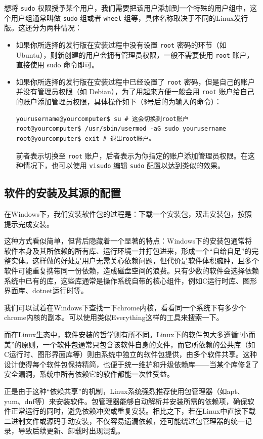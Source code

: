 想将 \verb|sudo| 权限授予某个用户，我们需要把该用户添加到一个特殊的用户组中，这个用户组通常叫做 \verb|sudo| 组或者 \verb|wheel| 组等，具体名称取决于不同的Linux发行版。这还分为两种情况：
\begin{itemize}
  \item 如果你所选择的发行版在安装过程中没有设置 \verb|root| 密码的环节（如 Ubuntu），则新创建的用户会拥有管理员权限，一般不需要使用 \verb|root| 账户，直接使用 sudo 命令即可。
  \item 如果你所选择的发行版在安装过程中已经设置了 \verb|root| 密码，但是自己的账户并没有管理员权限（如 Debian），为了用起来方便一般会用 \verb|root| 账户给自己的账户添加管理员权限，具体操作如下（\$号后的为输入的命令）：
\begin{verbatim}
yourusername@yourcomputer$ su # 这会切换到root账户
root@yourcomputer$ /usr/sbin/usermod -aG sudo yourusername
root@yourcomputer$ exit # 退出root账户。
\end{verbatim}
前者表示切换至 \verb|root| 账户，后者表示为你指定的账户添加管理员权限。在这种情况下，也可以使用 \verb|visudo| 编辑 \verb|sudo| 配置以达到类似的效果。
\end{itemize}

\subsection{软件的安装及其源的配置}\label{sec:apt-source}

在Windows下，我们安装软件包的过程是：下载一个安装包，双击安装包，按照提示完成安装。

这种方式看似简单，但背后隐藏着一个显著的特点：Windows下的安装包通常将软件本身及其所依赖的所有库、运行环境一并打包进来，形成一个“自给自足”的完整实体。这样做的好处是用户无需关心依赖问题，但代价是软件体积臃肿，且多个软件可能重复携带同一份依赖，造成磁盘空间的浪费。只有少数的软件会选择依赖系统中已有的库，这些库通常是操作系统自带的核心组件，例如C运行时库、图形界面库、dotnet运行时等。

我们可以试着在Windows下查找一下chrome内核，看看同一个系统下有多少个chrome内核的副本。可以使用类似Everything这样的工具来搜索一下。

而在Linux生态中，软件安装的哲学则有所不同。Linux下的软件包大多遵循“小而美”的原则，一个软件包通常只包含该软件自身的文件，而它所依赖的公共库（如C运行时、图形界面库等）则由系统中独立的软件包提供，由多个软件共享。这种设计使得每个软件包保持精简，也便于统一维护和升级依赖库——当某个库修复了安全漏洞，系统中所有依赖它的软件都能一次性受益。

正是由于这种“依赖共享”的机制，Linux系统强烈推荐使用包管理器（如apt、yum、dnf等）来安装软件。包管理器能够自动解析并安装所需的依赖项，确保软件正常运行的同时，避免依赖冲突或重复安装。相比之下，若在Linux中直接下载二进制文件或源码手动安装，不仅容易遗漏依赖，还可能绕过包管理器的统一记录，导致后续更新、卸载时出现混乱。

